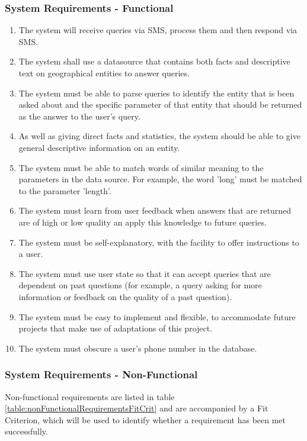 \documentclass{article}
\begin{document}
\subsubsection{System Requirements - Functional}
\label{subsubsec:systemRequirementsFunctional}
\begin{enumerate}
  \item The system will receive queries via SMS, process them and then respond via SMS.
  \item The system shall use a datasource that contains both facts and descriptive text on geographical entities to answer queries.
  \item The system must be able to parse queries to identify the entity that is been asked about and the specific parameter of that entity that should be returned as the answer to the user's query.
  \item As well as giving direct facts and statistics, the system should be able to give general descriptive information on an entity.
  \item The system must be able to match words of similar meaning to the parameters in the data source.  For example, the word 'long' must be matched to the parameter 'length'.
  \item The system must learn from user feedback when answers that are returned are of high or low quality an apply this knowledge to future queries.
  \item The system must be self-explanatory, with the facility to offer instructions to a user.
  \item The system must use user state so that it can accept queries that are dependent on past questions (for example, a query asking for more information or feedback on the quality of a past question).
  \item \label{requirement:easyToImplement} The system must be easy to implement and flexible, to accommodate future projects that make use of adaptations of this project.
  \item The system must obscure a user's phone number in the database.
\end{enumerate}

\subsubsection{System Requirements - Non-Functional}
\label{subsubsec:systemRequirementsNonFunctional}
Non-functional requirements are listed in table \ref{table:nonFunctionalRequirementsFitCrit} and are accompanied by a Fit Criterion, which will be used to identify whether a requirement has been met successfully.
\end{document}
